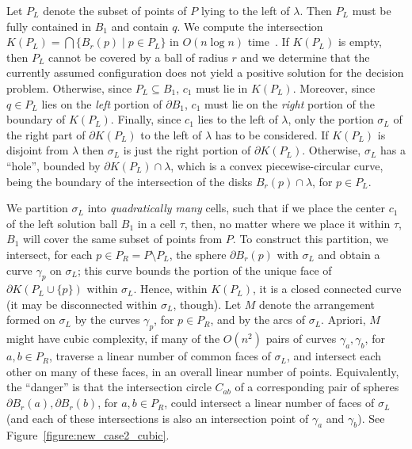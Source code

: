 \documentclass[a4paper,12pt]{article}
\def\bd{{\partial}}
\begin{document}
Let $P_L$ denote the subset
of points of $P$ lying to the left of $\lambda$. Then $P_L$
must be fully
contained in $B_1$ and contain $q$.
We compute the intersection $K(P_L) = \bigcap \{B_r(p) \mid p \in P_L\}$
in $O(n \log n)$ time~\cite{BCM}. If $K(P_L)$ is empty, then $P_L$ cannot be covered
by a ball of radius $r$ and we determine that the currently assumed
configuration does not yield a positive solution for the decision problem.
Otherwise, since $P_L \subseteq B_1$, $c_1$
must lie in
$K(P_L)$. Moreover, since $q \in P_L$ lies on the \emph{left} portion
of $\bd{B_1}$, $c_1$ must
lie on the \emph{right} portion of the boundary of $K(P_L)$. Finally, since $c_1$ lies to the
left of $\lambda$, only the portion $\sigma_L$ of the right part of $\bd{K(P_L)}$ to the left of $\lambda$ has to be considered.
If $K(P_L)$ is disjoint from $\lambda$ then $\sigma_L$ is just the right
portion of $\bd{K(P_L)}$. Otherwise, $\sigma_L$ has a ``hole'', bounded by $\bd{K(P_L)} \cap \lambda$, which is a convex piecewise-circular curve, being the boundary of the intersection of the disks $B_r(p) \cap \lambda$, for $p \in P_L$.

We partition $\sigma_L$ into \emph{quadratically many} cells, such
that if we place the center $c_1$ of the left solution ball $B_1$ in
a cell $\tau$, then, no matter where we place it within $\tau$,
$B_1$ will cover the same subset of points from $P$. To construct
this partition, we intersect, for each $p \in P_R = P \setminus
P_L$, the sphere $\bd{B_r(p)}$ with $\sigma_L$ and obtain a curve
$\gamma_p$ on $\sigma_L$; this curve bounds the portion of the
unique face of $\bd{K(P_L \cup \{p\})}$ within $\sigma_L$. Hence,
within $K(P_L)$, it is a closed connected curve (it may be
disconnected within $\sigma_L$, though). Let $M$ denote the
arrangement formed on $\sigma_L$ by the curves $\gamma_p$, for $p
\in P_R$, and by the arcs of $\sigma_L$. Apriori, $M$ might have
cubic complexity, if many of the $O(n^2)$ pairs of curves $\gamma_a,
\gamma_b$, for $a,b \in P_R$, traverse a linear number of common
faces of $\sigma_L$, and intersect each other on many of these
faces, in an overall linear number of points. Equivalently, the
``danger'' is that the intersection circle $C_{ab}$ of a
corresponding pair of spheres $\bd{B_r(a)}, \bd{B_r(b)}$, for $a,b
\in P_R$, could intersect a linear number of faces of $\sigma_L$
(and each of these intersections is also an intersection point of
$\gamma_a$ and $\gamma_b$). See Figure~\ref{figure:new_case2_cubic}.
\end{document}
